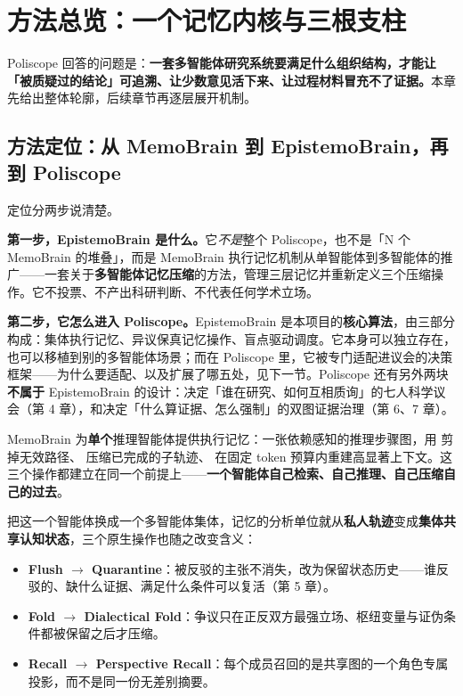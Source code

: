 \section{方法总览：一个记忆内核与三根支柱}

Poliscope 回答的问题是：\textbf{一套多智能体研究系统要满足什么组织结构，才能让「被质疑过的结论」可追溯、让少数意见活下来、让过程材料冒充不了证据。}本章先给出整体轮廓，后续章节再逐层展开机制。

\subsection{方法定位：从 MemoBrain 到 EpistemoBrain，再到 Poliscope}

定位分两步说清楚。

\textbf{第一步，EpistemoBrain 是什么。}它\emph{不是}整个 Poliscope，也不是「N 个 MemoBrain 的堆叠」，而是 MemoBrain 执行记忆机制从单智能体到多智能体的推广——一套关于\textbf{多智能体记忆压缩}的方法，管理三层记忆并重新定义三个压缩操作。它不投票、不产出科研判断、不代表任何学术立场。

\textbf{第二步，它怎么进入 Poliscope。}EpistemoBrain 是本项目的\textbf{核心算法}，由三部分构成：集体执行记忆、异议保真记忆操作、盲点驱动调度。它本身可以独立存在，也可以移植到别的多智能体场景；而在 Poliscope 里，它被专门适配进议会的决策框架——为什么要适配、以及扩展了哪五处，见下一节。Poliscope 还有另外两块\textbf{不属于} EpistemoBrain 的设计：决定「谁在研究、如何互相质询」的七人科学议会（第 4 章），和决定「什么算证据、怎么强制」的双图证据治理（第 6、7 章）。

MemoBrain 为\textbf{单个}推理智能体提供执行记忆：一张依赖感知的推理步骤图，用  剪掉无效路径、 压缩已完成的子轨迹、 在固定 token 预算内重建高显著上下文。这三个操作都建立在同一个前提上——\textbf{一个智能体自己检索、自己推理、自己压缩自己的过去}。

把这一个智能体换成一个多智能体集体，记忆的分析单位就从\textbf{私人轨迹}变成\textbf{集体共享认知状态}，三个原生操作也随之改变含义：

\begin{itemize}[leftmargin=1.6em, itemsep=3pt]
\item \textbf{Flush $\rightarrow$ Quarantine}：被反驳的主张不消失，改为保留状态历史——谁反驳的、缺什么证据、满足什么条件可以复活（第 5 章）。
\item \textbf{Fold $\rightarrow$ Dialectical Fold}：争议只在正反双方最强立场、枢纽变量与证伪条件都被保留之后才压缩。
\item \textbf{Recall $\rightarrow$ Perspective Recall}：每个成员召回的是共享图的一个角色专属投影，而不是同一份无差别摘要。
\end{itemize}

